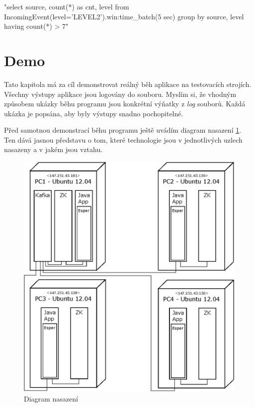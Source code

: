 \documentclass[
  digital, %
  table,   %
  nolof,     %
  nolot,     %
  oneside, %
  nocover,
  monochrome,
  12pt
]{fithesis3}
\begin{document}
\begin{center}
\begin{minipage}[H]{\linewidth}
	\begin{mylisting}
"select source, count(*) as cnt, level from
IncomingEvent(level='LEVEL2').win:time_batch(5 sec) group
by source, level having count(*) > 7"
	\end{mylisting}
	\label{fig:level_2_rule} 
\end{minipage}
\end{center}

\section{Demo}
\label{sec:demo}
Tato kapitola má za cíl demonstrovat reálný běh aplikace na testovacích strojích. Všechny výstupy aplikace jsou logovány do souboru. Myslím si, že vhodným způsobem ukázky běhu programu jsou konkrétní výňatky z \textit{log} souborů. Každá ukázka je popsána, aby byly výstupy snadno pochopitelné.

Před samotnou demonstrací běhu programu ještě uvádím diagram nasazení \ref{fig:deployment-diagram}. Ten dává jasnou představu o tom, které technologie jsou v jednotlivých uzlech nasazeny a v jakém jsou vztahu.

\begin{figure}[H]
	\centering
    \includegraphics[width=.75\linewidth, height=.5\textheight]{images/deployment-diagram.eps}
    \caption{Diagram nasazení}
    \label{fig:deployment-diagram}
\end{figure}
\end{document}
